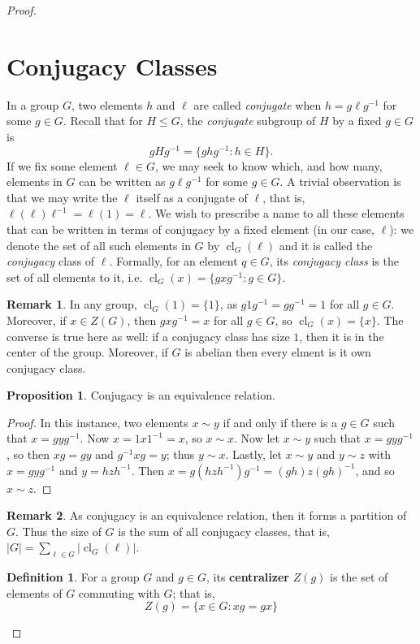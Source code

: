 \documentclass[9pt,reqno]{amsart}
\theoremstyle{definition}
\newtheorem{defi}{Definition}[section]
\newtheorem{rem}{Remark}[section]
\newtheorem{prop}{Proposition}[section]
\DeclareMathOperator{\cl}{cl}
\begin{document}
\begin{proof}
\section{Conjugacy Classes}
In a group $G$, two elements $h$ and $\ell $ are called \textit{conjugate} when $h = g \ell g^{-1}$ for some $g \in G$. Recall that for $H \leq G$, the \textit{conjugate} subgroup of $H$ by a fixed $g \in G$ is $$gHg^{-1} = \{ ghg^{-1} \colon h \in H \}.$$
If we fix some element $\ell \in G$, we may seek to know which, and how many, elements in $G$ can be written as $g \ell g^{-1}$ for some $g \in G$. A trivial observation is that we may write the  $\ell$ itself as a conjugate of $\ell$, that is, $\ell (\ell) \ell^{-1} = \ell (1) = \ell$. We wish to prescribe a name to all these elements that can be written in terms of conjugacy by a fixed element (in our case, $\ell$): we denote the set of all such elements in $G$ by $\cl_G (\ell)$ and it is called the \textit{conjugacy} class of $\ell$. Formally, for an element $q \in G$, its \textit{conjugacy class} is the set of all elements to it, i.e. $\cl_G(x) = \{ g x g^{-1} \colon g \in G \}$. 
\begin{rem}
In any group, $\cl_G (1) = \{ 1 \}$, as $g 1 g^{-1} = gg^{-1} = 1$ for all $g \in G$. Moreover, if $x \in Z(G)$, then $gxg^{-1} = x$ for all $g \in G$, so $\cl_G (x) = \{ x \}$. The converse is true here as well: if a conjugacy class has size $1$, then it is in the center of the group. Moreover, if $G$ is abelian then every elment is it own conjugacy class. 
\end{rem}
\begin{prop}
Conjugacy is an equivalence relation. 	
\end{prop}
\begin{proof}
	In this instance, two elements $x \sim y$ if and only if there is a $g \in G$ such that $x = gyg^{-1}$. Now $x = 1x1^{-1} = x$, so $x \sim x$. Now let $x \sim y$ such that $x = gyg^{-1}$, so then $xg = gy$ and $g^{-1} x g= y$; thus $y \sim x$. Lastly, let $x \sim y$ and $y \sim z$ with $x = gyg^{-1}$ and $y = hzh^{-1}$. Then  $x = g(hzh^{-1})g^{-1} = (gh)z(gh)^{-1}$, and so $x \sim z$. 
\end{proof}
\begin{rem}
	As conjugacy is an equivalence relation, then it forms a partition of $G$. Thus the size of $G$ is the sum of all conjugacy classes, that is, $|G| = \sum_{\ell \in G} |\cl_G (\ell) |$. 
\end{rem}
\begin{defi}
For a group $G$ and $g \in G$, its \textbf{centralizer} $Z(g)$ is the set of elements of $G$ commuting with $G$; that is, 
$$Z(g) = \{ x \in G \colon xg = gx \}$$	
\end{defi}


\end{proof}
\end{document}
